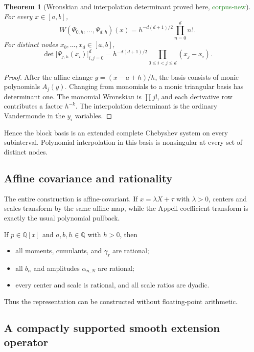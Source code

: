 \documentclass[11pt]{article}
\newtheorem{theorem}{Theorem}[section]
\theoremstyle{definition}
\theoremstyle{remark}
\newcommand{\Q}{\mathbb{Q}}
\newcommand{\1}{\mathbf{1}}
\newcommand{\CorpusNew}{\textcolor{ForestGreen}{\textsf{corpus-new}}}
\newcommand{\ProvedHere}{\textcolor{BrickRed}{\textsf{proved here}}}
\begin{document}
\begin{theorem}[Wronskian and interpolation determinant \ProvedHere, \CorpusNew]
\label{thm:determinants}
For every $x\in[a,b]$,
\begin{equation}
 W(\Psi_{0,h},\ldots,\Psi_{d,h})(x)
 =h^{-d(d+1)/2}\prod_{n=0}^{d}n!.
 \label{eq:Wronskian}
\end{equation}
For distinct nodes $x_0,\ldots,x_d\in[a,b]$,
\begin{equation}
 \det\bigl[\Psi_{j,h}(x_i)\bigr]_{i,j=0}^{d}
 =h^{-d(d+1)/2}\prod_{0\leq i<j\leq d}(x_j-x_i).
 \label{eq:interpolation-det}
\end{equation}
\end{theorem}

\begin{proof}
After the affine change $y=(x-a+h)/h$, the basis consists of monic polynomials
$A_j(y)$.  Changing from monomials to a monic triangular basis has determinant
one.  The monomial Wronskian is $\prod j!$, and each derivative row contributes
a factor $h^{-k}$.  The interpolation determinant is the ordinary Vandermonde
in the $y_i$ variables.
\end{proof}

Hence the block basis is an extended complete Chebyshev system on every
subinterval.  Polynomial interpolation in this basis is nonsingular at every
set of distinct nodes.

\subsection{Affine covariance and rationality}

The entire construction is affine-covariant.  If $x=\lambda X+\tau$ with
$\lambda>0$, centers and scales transform by the same affine map, while the
Appell coefficient transform is exactly the usual polynomial pullback.

If $p\in\Q[x]$ and $a,b,h\in\Q$ with $h>0$, then
\begin{itemize}
\item all moments, cumulants, and $\gamma_r$ are rational;
\item all $b_n$ and amplitudes $\alpha_{n,N}$ are rational;
\item every center and scale is rational, and all scale ratios are dyadic.
\end{itemize}
Thus the representation can be constructed without floating-point arithmetic.

\subsection{A compactly supported smooth extension operator}
\end{document}
